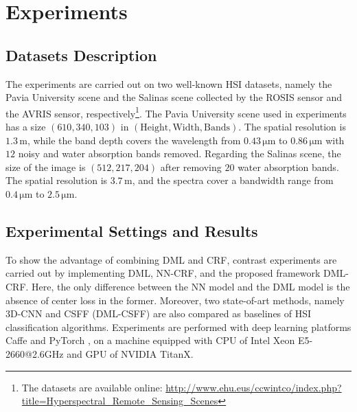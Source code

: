 \documentclass[]{article}
\newcommand{\red}{\color{black}}
\newcommand{\magentaso}{\color{black}}
\begin{document}
\section{Experiments}\label{sec: Experiments}
\subsection{Datasets Description}
The experiments are carried out on two well-known HSI datasets,
namely the Pavia University scene and the Salinas scene collected by the
ROSIS sensor and the AVRIS sensor, respectively{\footnote{The datasets are available online: \url{http://www.ehu.eus/ccwintco/index.php?title=Hyperspectral_Remote_Sensing_Scenes}}}.
The Pavia University scene used in experiments has a size
$(610, 340, 103)$ in $(\mathrm{Height},\mathrm{Width},\mathrm{Bands})$.
The spatial resolution is $1.3\,\mathrm{m}$, 
while the band depth covers the wavelength from $0.43\,\mathrm{\mu m}$ 
to $0.86\,\mathrm{\mu m}$ with $12$ noisy and water absorption bands removed.
{\red Regarding the Salinas scene, the size of the image is $(512, 217, 204)$ 
after removing $20$ water absorption bands. 
The spatial resolution is $3.7\,\mathrm{m}$, and the spectra cover a bandwidth 
range from $0.4\,\mathrm{\mu m}$ to $2.5\,\mathrm{\mu m}$.}

\subsection{Experimental Settings and Results}
To show the advantage of combining DML and CRF, {\red contrast} experiments are carried out by 
{\magentaso implementing} DML, NN-CRF, and the proposed framework DML-CRF.
Here, the only difference between the NN model and the DML model is the absence of 
center loss in the former. Moreover, two state-of-art methods,
namely $3$D-CNN \cite{chen2016deep} and CSFF (DML-CSFF) \cite{guo2018cnn} are also compared 
as baselines of HSI classification algorithms.
Experiments are {\magentaso performed} with deep learning platforms Caffe \cite{jia2014caffe} and PyTorch \cite{paszke2017automatic},
on a machine equipped with CPU of Intel Xeon E5-2660@2.6GHz and
GPU of NVIDIA TitanX.
\end{document}
